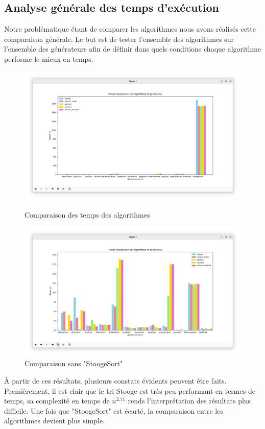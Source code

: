 \documentclass[a4paper,12pt]{article}
\begin{document}
\subsection{Analyse générale des temps d'exécution}
Notre problématique étant de comparer les algorithmes nous avons réalisés cette comparaison générale. Le but est de tester l'ensemble des algorithmes sur l'ensemble des générateurs afin de définir dans quels conditions chaque algorithme performe le mieux en temps. 
\begin{figure}[H]
  \centering
  \begin{minipage}[b]{0.45\textwidth}
    \includegraphics[width=\textwidth]{ScreenWithStooge.png}
    \caption{Comparaison des temps des algorithmes}
    \label{fig:ScreenWithStooge}
  \end{minipage}
  \hfill
  \begin{minipage}[b]{0.45\textwidth}
    \includegraphics[width=\textwidth]{ScreenBetter.png}
    \caption{Comparaison sans "StoogeSort"}
    \label{fig:ScreenBetter}
  \end{minipage}
\end{figure}
À partir de ces résultats, plusieurs constats évidents peuvent être faits. Premièrement, il est clair que le tri Stooge est très peu performant en termes de temps, sa complexité en temps de $n^{2.71}$
rends l'interprétation des résultats plus difficile. Une fois que "StoogeSort" est écarté, la comparaison entre les algorithmes devient plus simple. 
\end{document}
